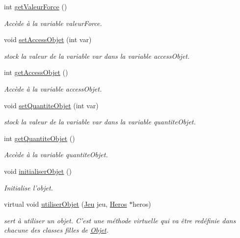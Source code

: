 \begin{DoxyCompactItemize}
int \hyperlink{class_objet_af57c602bd00d1478cfefb8d568bad309}{get\-Valeur\-Force} ()
\begin{DoxyCompactList}\small\item\em Accède à la variable valeur\-Force. \end{DoxyCompactList}\item 
void \hyperlink{class_objet_a867e1cec21732464c50251d8b5abb00e}{set\-Access\-Objet} (int var)
\begin{DoxyCompactList}\small\item\em stock la valeur de la variable var dans la variable access\-Objet. \end{DoxyCompactList}\item 
int \hyperlink{class_objet_a89e96aceca5fa4ff383bec982be3e39a}{get\-Access\-Objet} ()
\begin{DoxyCompactList}\small\item\em Accède à la variable access\-Objet. \end{DoxyCompactList}\item 
void \hyperlink{class_objet_a667447b583f58e06a0ac8407d2fed45a}{set\-Quantite\-Objet} (int var)
\begin{DoxyCompactList}\small\item\em stock la valeur de la variable var dans la variable quantite\-Objet. \end{DoxyCompactList}\item 
int \hyperlink{class_objet_a48ed4b5205b42401520102586cfe2265}{get\-Quantite\-Objet} ()
\begin{DoxyCompactList}\small\item\em Accède à la variable quantite\-Objet. \end{DoxyCompactList}\item 
void \hyperlink{class_objet_a812fd7438f15ff8f5b530187affc3cc9}{initialiser\-Objet} ()
\begin{DoxyCompactList}\small\item\em Initialise l'objet. \end{DoxyCompactList}\item 
virtual void \hyperlink{class_objet_ab8c32a2e0b236fcf75a06a2edc1f71b6}{utiliser\-Objet} (\hyperlink{class_jeu}{Jeu} jeu, \hyperlink{class_heros}{Heros} $\ast$heros)
\begin{DoxyCompactList}\small\item\em sert à utiliser un objet. C'est une méthode virtuelle qui va être redéfinie dans chacune des classes filles de \hyperlink{class_objet}{Objet}. \end{DoxyCompactList}\end{DoxyCompactItemize}
